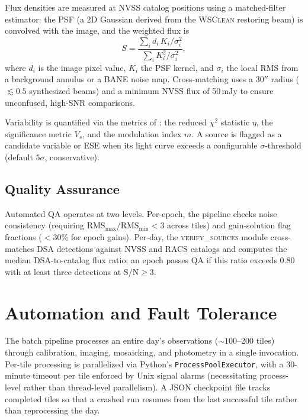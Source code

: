 \documentclass[twocolumn,11pt]{article}
\newcommand{\wsclean}{\textsc{WSClean}\xspace}
\begin{document}
Flux densities are measured at NVSS catalog positions using a
\citet{condon1997} matched-filter estimator: the PSF (a 2D Gaussian
derived from the \wsclean restoring beam) is convolved with the image,
and the weighted flux is
\begin{equation}
  S = \frac{\sum_{i} d_i\, K_i / \sigma_i^{2}}%
           {\sum_{i} K_i^{2} / \sigma_i^{2}},
\end{equation}
where $d_i$ is the image pixel value, $K_i$ the PSF kernel, and
$\sigma_i$ the local RMS from a background annulus or a BANE noise map.
Cross-matching uses a 30$''$ radius ($\lesssim 0.5$ synthesized beams)
and a minimum NVSS flux of 50\,mJy to ensure unconfused, high-SNR
comparisons.

Variability is quantified via the metrics of \citet{mooley2016}: the
reduced $\chi^{2}$ statistic $\eta$, the significance metric $V_{s}$,
and the modulation index $m$.  A source is flagged as a candidate
variable or ESE when its light curve exceeds a configurable
$\sigma$-threshold (default $5\sigma$, conservative).

\subsection{Quality Assurance}\label{sec:qa}

Automated QA operates at two levels.  Per-epoch, the pipeline checks
noise consistency (requiring $\mathrm{RMS}_{\max}/\mathrm{RMS}_{\min}
< 3$ across tiles) and gain-solution flag fractions ($<30\%$ for epoch
gains).  Per-day, the \textsc{verify\_sources} module cross-matches
DSA detections against NVSS and RACS catalogs and computes the median
DSA-to-catalog flux ratio; an epoch passes QA if this ratio exceeds 0.80
with at least three detections at $\mathrm{S/N}\geq3$.


\section{Automation and Fault Tolerance}\label{sec:automation}

The batch pipeline processes an entire day's observations
($\sim\!100$--200 tiles) through calibration, imaging, mosaicking, and
photometry in a single invocation.  Per-tile processing is parallelized
via Python's \texttt{ProcessPoolExecutor}, with a 30-minute timeout per
tile enforced by Unix signal alarms (necessitating process-level rather
than thread-level parallelism).  A JSON checkpoint file tracks completed
tiles so that a crashed run resumes from the last successful tile rather
than reprocessing the day.
\end{document}
